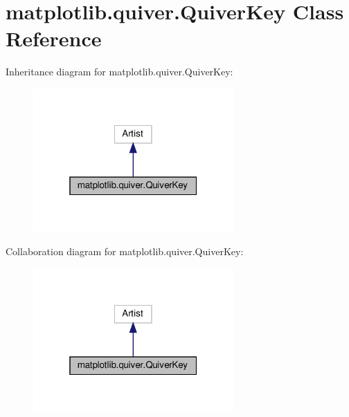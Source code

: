 \hypertarget{classmatplotlib_1_1quiver_1_1QuiverKey}{}\section{matplotlib.\+quiver.\+Quiver\+Key Class Reference}
\label{classmatplotlib_1_1quiver_1_1QuiverKey}


Inheritance diagram for matplotlib.\+quiver.\+Quiver\+Key\+:
\nopagebreak
\begin{figure}[H]
\begin{center}
\leavevmode
\includegraphics[width=217pt]{classmatplotlib_1_1quiver_1_1QuiverKey__inherit__graph}
\end{center}
\end{figure}


Collaboration diagram for matplotlib.\+quiver.\+Quiver\+Key\+:
\nopagebreak
\begin{figure}[H]
\begin{center}
\leavevmode
\includegraphics[width=217pt]{classmatplotlib_1_1quiver_1_1QuiverKey__coll__graph}
\end{center}
\end{figure}
